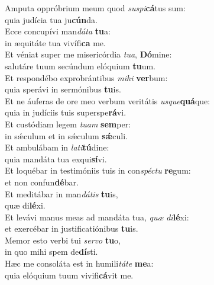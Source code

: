 \oddverse Amputa oppróbrium meum quod \textit{su}\textit{spi}\textbf{cá}tus sum:~\*\\
\oddverse quia judícia tua ju\textbf{cún}da.\\
\evenverse Ecce concupívi man\textit{dá}\textit{ta} \textbf{tu}a:~\*\\
\evenverse in æquitáte tua vivífi\textbf{ca} me.\\
\oddverse Et véniat super me misericórdia \textit{tu}\textit{a}, \textbf{Dó}mine:~\*\\
\oddverse salutáre tuum secúndum elóquium \textbf{tu}um.\\
\evenverse Et respondébo exprobrántibus \textit{mi}\textit{hi} \textbf{ver}bum:~\*\\
\evenverse quia sperávi in sermónibus \textbf{tu}is.\\
\oddverse Et ne áuferas de ore meo verbum veritátis \textit{us}\textit{que}\textbf{quá}que:~\*\\
\oddverse quia in judíciis tuis superspe\textbf{rá}vi.\\
\evenverse Et custódiam legem \textit{tu}\textit{am} \textbf{sem}per:~\*\\
\evenverse in sǽculum et in sǽculum \textbf{sǽ}culi.\\
\oddverse Et ambulábam in \textit{la}\textit{ti}\textbf{tú}dine:~\*\\
\oddverse quia mandáta tua exqui\textbf{sí}vi.\\
\evenverse Et loquébar in testimóniis tuis in con\textit{spé}\textit{ctu} \textbf{re}gum:~\*\\
\evenverse et non confun\textbf{dé}bar.\\
\oddverse Et meditábar in man\textit{dá}\textit{tis} \textbf{tu}is,~\*\\
\oddverse quæ di\textbf{lé}xi.\\
\evenverse Et levávi manus meas ad mandáta tua, \textit{quæ} \textit{di}\textbf{lé}xi:~\*\\
\evenverse et exercébar in justificatiónibus \textbf{tu}is.\\
\oddverse Memor esto verbi tui \textit{ser}\textit{vo} \textbf{tu}o,~\*\\
\oddverse in quo mihi spem de\textbf{dí}sti.\\
\evenverse Hæc me consoláta est in humili\textit{tá}\textit{te} \textbf{me}a:~\*\\
\evenverse quia elóquium tuum vivifi\textbf{cá}vit me.\\

